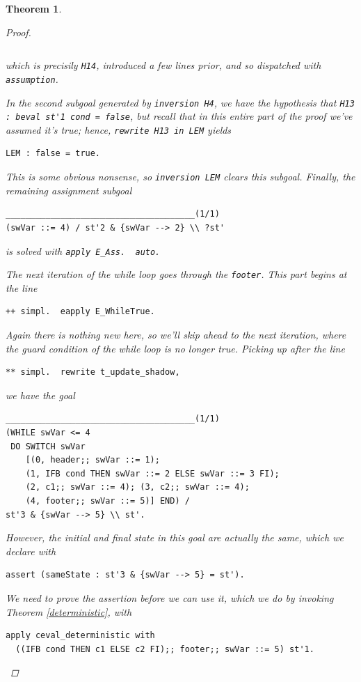 \documentclass[12pt,notitlepage]{report}
\theoremstyle{plain}
\newtheorem{theo}{Theorem}[section]
\theoremstyle{definition}
\numberwithin{equation}{section}
\begin{document}
\begin{theo}
\begin{proof}
\begin{itemize}
\begin{itemize}
\begin{verbatim}
\end{verbatim}
which is precisily \verb$H14$, introduced a few lines prior, and so dispatched with \verb$assumption$.
\par In the second subgoal generated by \verb$inversion H4$, we have the hypothesis that
\verb$H13 : beval st'1 cond = false$, but recall that in this entire part of the proof we've assumed it's true; hence, \verb$rewrite H13 in LEM$ yields
\begin{verbatim}LEM : false = true.\end{verbatim}
\par This is some obvious nonsense, so \verb$inversion LEM$ clears this subgoal.  Finally, the remaining assignment subgoal
\begin{verbatim}
______________________________________(1/1)
(swVar ::= 4) / st'2 & {swVar --> 2} \\ ?st'
\end{verbatim}
is solved with \verb$apply E_Ass.  auto.$
\par The next iteration of the while loop goes through the \verb$footer$.  This part begins at the line
\begin{verbatim}++ simpl.  eapply E_WhileTrue.\end{verbatim}
Again there is nothing new here, so we'll skip ahead to the next iteration, where the guard condition of the while loop is no longer true.  Picking up after the line
\begin{verbatim}
** simpl.  rewrite t_update_shadow,
\end{verbatim}
we have the goal 
\begin{verbatim}
______________________________________(1/1)
(WHILE swVar <= 4
 DO SWITCH swVar
    [(0, header;; swVar ::= 1);
    (1, IFB cond THEN swVar ::= 2 ELSE swVar ::= 3 FI);
    (2, c1;; swVar ::= 4); (3, c2;; swVar ::= 4);
    (4, footer;; swVar ::= 5)] END) /
st'3 & {swVar --> 5} \\ st'.
\end{verbatim}
However, the initial and final state in this goal are actually the same, which we declare with
\begin{verbatim}assert (sameState : st'3 & {swVar --> 5} = st').\end{verbatim}
We need to prove the assertion before we can use it, which we do by invoking Theorem \ref{deterministic}, with
\begin{verbatim}
apply ceval_deterministic with 
  ((IFB cond THEN c1 ELSE c2 FI);; footer;; swVar ::= 5) st'1.
\end{verbatim}

\end{itemize}
\end{itemize}
\end{proof}
\end{theo}
\end{document}
